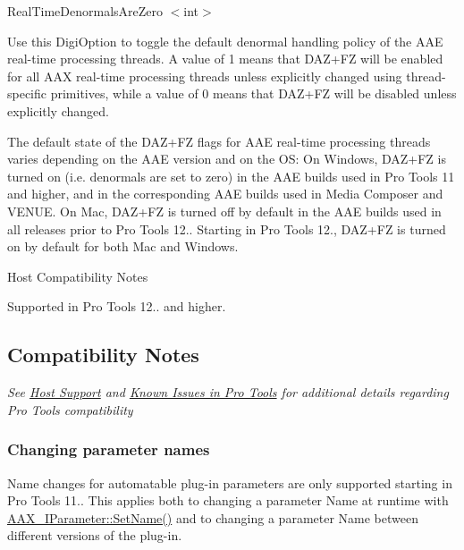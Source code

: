 \begin{DoxyItemize}
\item  {\ttfamily Real\+Time\+Denormals\+Are\+Zero $<$int$>$}

Use this Digi\+Option to toggle the default denormal handling policy of the A\+A\+E real-\/time processing threads. A value of 1 means that D\+A\+Z+\+F\+Z will be enabled for all A\+A\+X real-\/time processing threads unless explicitly changed using thread-\/specific primitives, while a value of 0 means that D\+A\+Z+\+F\+Z will be disabled unless explicitly changed.

The default state of the D\+A\+Z+\+F\+Z flags for A\+A\+E real-\/time processing threads varies depending on the A\+A\+E version and on the O\+S\+: On Windows, D\+A\+Z+\+F\+Z is turned on (i.\+e. denormals are set to zero) in the A\+A\+E builds used in Pro Tools 11 and higher, and in the corresponding A\+A\+E builds used in Media Composer and V\+E\+N\+U\+E. On Mac, D\+A\+Z+\+F\+Z is turned off by default in the A\+A\+E builds used in all releases prior to Pro Tools 12.. Starting in Pro Tools 12., D\+A\+Z+\+F\+Z is turned on by default for both Mac and Windows.

\begin{DoxyRefDesc}{Host Compatibility Notes}
\item[\hyperlink{a00380__compatibility_notes000018}{Host Compatibility Notes}]Supported in Pro Tools 12.. and higher.\end{DoxyRefDesc}





\end{DoxyItemize}



 \hypertarget{a00360_aax_pro_tools_guide_07_compatibility_notes}{}\subsection{Compatibility Notes}\label{a00360_aax_pro_tools_guide_07_compatibility_notes}
{\itshape See \hyperlink{a00373}{Host Support} and \hyperlink{a00374_knownissues_ptsw}{Known Issues in Pro Tools} for additional details regarding Pro Tools compatibility }

\hypertarget{a00360_subsection__changing_parameter_names}{}\subsubsection{Changing parameter names}\label{a00360_subsection__changing_parameter_names}
Name changes for automatable plug-\/in parameters are only supported starting in Pro Tools 11.. This applies both to changing a parameter Name at runtime with \hyperlink{a00108_a480e9947cdaee6f26ca2bbaeb9de56b2}{A\+A\+X\+\_\+\+I\+Parameter\+::\+Set\+Name()} and to changing a parameter Name between different versions of the plug-\/in.

